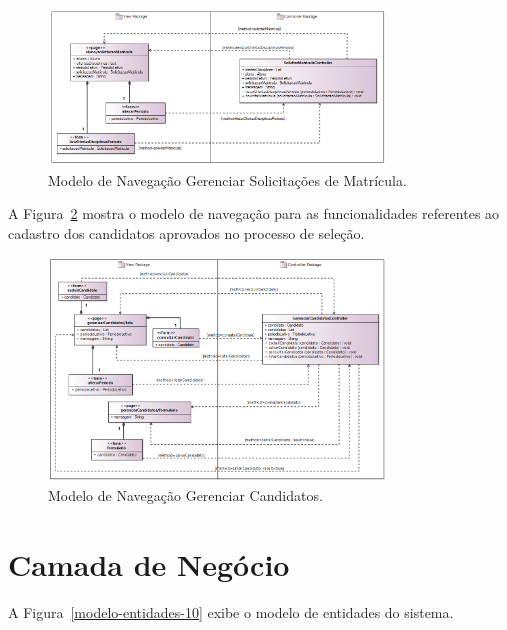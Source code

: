 \begin{figure}[h]
	\centering
	\includegraphics[width=0.8\textwidth]{figuras/navegacao-solicitar-matricula-10.png}
	\caption{Modelo de Navegação Gerenciar Solicitações de Matrícula.}
	\label{navegacao-gerenciar-solicitacoes-matricula-10}
\end{figure}

A Figura~\ref{navegacao-gerenciar-candidatos-10} mostra o modelo de navegação para as funcionalidades referentes ao cadastro dos candidatos aprovados no processo de seleção.

\begin{figure}[h]
	\centering
	\includegraphics[width=0.8\textwidth]{figuras/navegacao-gerenciar-candidatos-10.png}
	\caption{Modelo de Navegação Gerenciar Candidatos.}
	\label{navegacao-gerenciar-candidatos-10}
\end{figure}



\section{Camada de Negócio}
\label{sec-arquitetura-negocio}

A Figura~\ref{modelo-entidades-10} exibe o modelo de entidades do sistema.

